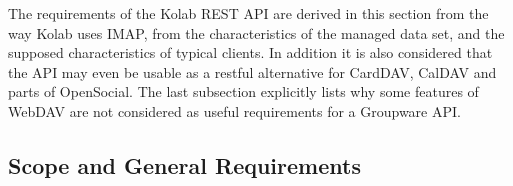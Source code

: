 \documentclass[11pt,a4paper,headsepline,twoside]{scrartcl}		%
\begin{document}
The requirements of the Kolab REST API are derived in this section from the way
Kolab uses IMAP, from the characteristics of the managed data set, and the
supposed characteristics of typical clients. In addition it is also considered
that the API may even be usable as a restful alternative for CardDAV, CalDAV and
parts of OpenSocial. The last subsection explicitly lists why some features of
WebDAV are not considered as useful requirements for a Groupware API.




\subsection{Scope and General Requirements}
\end{document}
